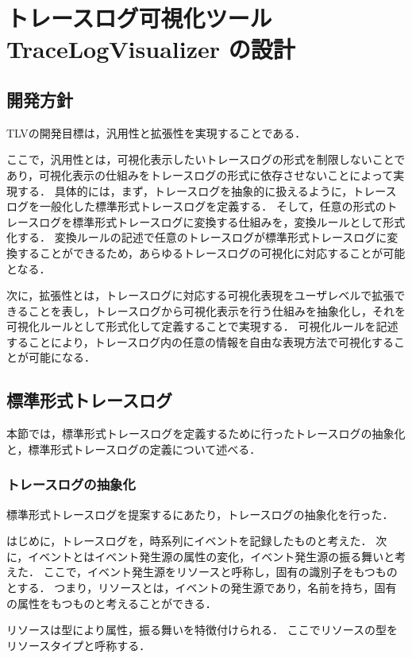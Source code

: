 \chapter{トレースログ可視化ツール TraceLogVisualizer の設計}

\section{開発方針}
TLVの開発目標は，汎用性と拡張性を実現することである．

ここで，汎用性とは，可視化表示したいトレースログの形式を制限しないことであり，可視化表示の仕組みをトレースログの形式に依存させないことによって実現する．
具体的には，まず，トレースログを抽象的に扱えるように，トレースログを一般化した標準形式トレースログを定義する．
そして，任意の形式のトレースログを標準形式トレースログに変換する仕組みを，変換ルールとして形式化する．
変換ルールの記述で任意のトレースログが標準形式トレースログに変換することができるため，あらゆるトレースログの可視化に対応することが可能となる．

次に，拡張性とは，トレースログに対応する可視化表現をユーザレベルで拡張できることを表し，トレースログから可視化表示を行う仕組みを抽象化し，それを可視化ルールとして形式化して定義することで実現する．
可視化ルールを記述することにより，トレースログ内の任意の情報を自由な表現方法で可視化することが可能になる．


\section{標準形式トレースログ}

本節では，標準形式トレースログを定義するために行ったトレースログの抽象化と，標準形式トレースログの定義について述べる．

\subsection{トレースログの抽象化}

標準形式トレースログを提案するにあたり，トレースログの抽象化を行った．

はじめに，トレースログを，時系列にイベントを記録したものと考えた．
次に，イベントとはイベント発生源の属性の変化，イベント発生源の振る舞いと考えた．
ここで，イベント発生源をリソースと呼称し，固有の識別子をもつものとする．
つまり，リソースとは，イベントの発生源であり，名前を持ち，固有の属性をもつものと考えることができる．

リソースは型により属性，振る舞いを特徴付けられる．
ここでリソースの型をリソースタイプと呼称する．

